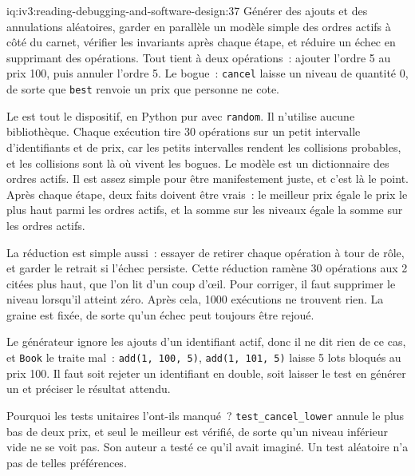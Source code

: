\begin{solution}{iq:iv3:reading-debugging-and-software-design:37}
Générer des ajouts et des annulations aléatoires, garder en parallèle un modèle simple des ordres actifs à côté du carnet, vérifier les invariants après chaque étape, et réduire un échec en supprimant des opérations. Tout tient à deux opérations~: ajouter l'ordre 5 au prix 100, puis annuler l'ordre 5. Le bogue~: \texttt{cancel} laisse un niveau de quantité 0, de sorte que \texttt{best} renvoie un prix que personne ne cote.

Le  est tout le dispositif, en Python pur avec \texttt{random}. Il n'utilise aucune bibliothèque. Chaque exécution tire 30 opérations sur un petit intervalle d'identifiants et de prix, car les petits intervalles rendent les collisions probables, et les collisions sont là où vivent les bogues. Le modèle est un dictionnaire des ordres actifs. Il est assez simple pour être manifestement juste, et c'est là le point. Après chaque étape, deux faits doivent être vrais~: le meilleur prix égale le prix le plus haut parmi les ordres actifs, et la somme sur les niveaux égale la somme sur les ordres actifs.

\label{lst:iv3:rd:propcheck}

La réduction est simple aussi~: essayer de retirer chaque opération à tour de rôle, et garder le retrait si l'échec persiste. Cette réduction ramène 30 opérations aux 2 citées plus haut, que l'on lit d'un coup d'œil. Pour corriger, il faut supprimer le niveau lorsqu'il atteint zéro. Après cela, 1000 exécutions ne trouvent rien. La graine est fixée, de sorte qu'un échec peut toujours être rejoué.

Le générateur ignore les ajouts d'un identifiant actif, donc il ne dit rien de ce cas, et \texttt{Book} le traite mal~: \texttt{add(1, 100, 5)}, \texttt{add(1, 101, 5)} laisse 5 lots bloqués au prix 100. Il faut soit rejeter un identifiant en double, soit laisser le test en générer un et préciser le résultat attendu.

Pourquoi les tests unitaires l'ont-ils manqué~? \texttt{test\_cancel\_lower} annule le plus bas de deux prix, et seul le meilleur est vérifié, de sorte qu'un niveau inférieur vide ne se voit pas. Son auteur a testé ce qu'il avait imaginé. Un test aléatoire n'a pas de telles préférences.


\end{solution}
